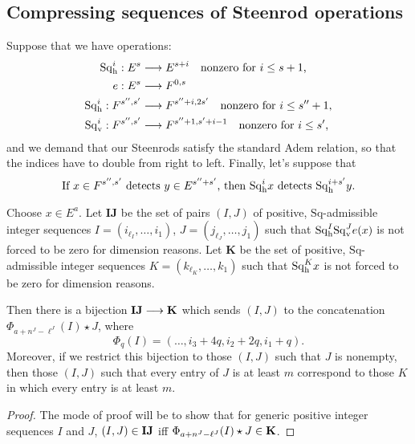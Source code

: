\documentclass[10pt]{article}
\newcommand{\Sq}{\mathrm{Sq}}
\begin{document}
\begin{CompressingSequencesOfSteenrodOperations}
\section{Compressing sequences of Steenrod operations}
Suppose that we have operations:
\begin{alignat*}{2}
\Sq_\textup{h}^i:E^{s}&\to E^{s+i}\textup{\quad nonzero for $i\leq s+1$,}\\
e:E^{s}&\to F^{0,s}\\
\Sq_\textup{h}^i:F^{s'',s'}&\to F^{s''+i,2s'}\textup{\quad nonzero for $i\leq s''+1$,}\\
\Sq_\textup{v}^i:F^{s'',s'}&\to F^{s''+1,s'+i-1}\textup{\quad nonzero for $i\leq s'$,}
\end{alignat*}
and we demand that our Steenrods satisfy the standard Adem relation, so that the indices have to double from right to left. Finally, let's suppose that 
\[\textup{If $x\in F^{s'',s'}$ detects $y\in E^{s''+s'}$, then $\Sq_\textup{h}^ix$ detects $\Sq_\textup{h}^{i+s'}y$}.\]

Choose $x\in E^{a}$. Let $\textbf{IJ}$ be the set of pairs $(I,J)$ of positive, $\Sq$-admissible integer sequences $I=(i_{\ell_I},\ldots,i_1)$, $J=(j_{\ell_J},\ldots,j_1)$ such that $\Sq_\textup{h}^I\Sq_\textup{v}^Je(x)$ is not forced to be zero for dimension reasons. Let $\textbf{K}$ be the set of positive, $\Sq$-admissible integer sequences $K=(k_{\ell_K},\ldots,k_1)$ such that $\Sq_\textup{h}^Kx$ is not forced to be zero for dimension reasons.
\begin{prop}
Then there is a bijection $\textup{\textbf{IJ}}\to\textup{\textbf{K}}$ which sends $(I,J)$ to the concatenation $\Phi_{a+n^J-\ell^J}(I)\star J$, where 
\[\Phi_q(I)=(\ldots,i_3+4q,i_2+2q,i_1+q).\]
Moreover, if we restrict this bijection to those $(I,J)$ such that $J$ is nonempty, then those $(I,J)$ such that every entry of $J$ is at least $m$ correspond to those $K$ in which every entry is at least $m$.
\end{prop}
\begin{proof}
The mode of proof will be to show that for generic positive integer sequences $I$ and $J$, $(I,J)\in\textup{\textbf{IJ}}$ iff $\Phi_{a+n^J-\ell^J}(I)\star J\in\textup{\textbf{K}}$.


\end{proof}
\end{CompressingSequencesOfSteenrodOperations}
\end{document}
